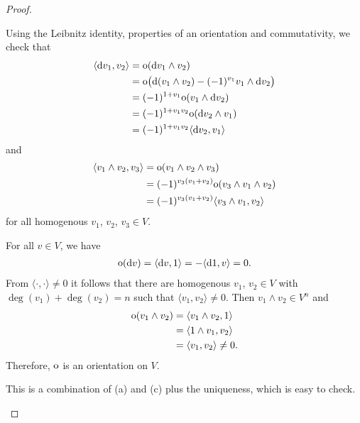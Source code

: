 \documentclass[\MainFolder/Text.tex]{subfiles}
\begin{document}
\begin{proof}
\begin{ProofList}
\item  Using the Leibnitz identity, properties of an orientation and commutativity, we check that
\begin{align*}
\langle \mathrm{d} v_1, v_2 \rangle &= \mathrm{o}(\mathrm{d} v_1 \wedge v_2) \\
&= \mathrm{o}\bigl(\mathrm{d}(v_1\wedge v_2) - (-1)^{v_1} v_1 \wedge \mathrm{d} v_2\bigr) \\
&= (-1)^{1+v_1}\mathrm{o}(v_1\wedge\mathrm{d} v_2)\\
&= (-1)^{1+v_1 v_2} \mathrm{o}(\mathrm{d} v_2 \wedge v_1) \\
&= (-1)^{1+v_1 v_2} \langle \mathrm{d} v_2, v_1\rangle
\end{align*}
and 
\begin{align*}
\langle v_1\wedge v_2, v_3\rangle &= \mathrm{o}(v_1\wedge v_2\wedge v_3)\\
&= (-1)^{v_3(v_1+v_2)} \mathrm{o}(v_3 \wedge v_1 \wedge v_2)\\
&= (-1)^{v_3(v_1+v_2)} \langle v_3\wedge v_1, v_2\rangle
\end{align*}
for all homogenous $v_1$, $v_2$, $v_3\in V$.
\item For all $v\in V$, we have
\begin{align*}
\mathrm{o}(\mathrm{d} v) = \langle \mathrm{d} v, 1 \rangle = - \langle \mathrm{d} 1, v \rangle = 0.
\end{align*}
From $\langle\cdot,\cdot\rangle \neq 0$ it follows that there are homogenous $v_1$, $v_2\in V$ with $\deg(v_1) + \deg(v_2) = n$ such that $\langle v_1, v_2 \rangle \neq 0$. Then $v_1\wedge v_2\in V^n$ and
\begin{align*}
\mathrm{o}(v_1 \wedge v_2) &= \langle v_1\wedge v_2,1\rangle\\
&= \langle 1 \wedge v_1, v_2\rangle\\
&=\langle v_1,v_2\rangle \neq 0.
\end{align*}
Therefore, $\mathrm{o}$ is an orientation on $V$.
\item This is a combination of (a) and (c) plus the uniqueness, which is easy to check.\qedhere
\end{ProofList}
\end{proof}
\end{document}
